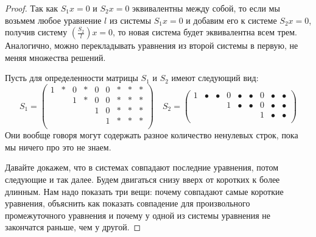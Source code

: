 \begin{proof}
Так как $S_1 x = 0$ и $S_2x = 0$ эквивалентны между собой, то если мы возьмем любое уравнение $l$ из системы $S_1 x = 0$ и добавим его к системе $S_2 x = 0$, получив систему $\left(\frac{S_2}{l}\right)x=0$, то новая система будет эквивалентна всем трем. Аналогично, можно перекладывать уравнения из второй системы в первую, не меняя множества решений.

Пусть для определенности матрицы $S_1$  и $S_2$ имеют следующий вид:
\[
S_1 = 
\begin{pmatrix}
{1}&{*}&{0}&{*}&{0}&{0}&{*}&{*}&{*}\\
{}&{}&{1}&{*}&{0}&{0}&{*}&{*}&{*}\\
{}&{}&{}&{}&{1}&{0}&{*}&{*}&{*}\\
{}&{}&{}&{}&{}&{1}&{*}&{*}&{*}\\
\end{pmatrix}\quad
S_2 = 
\begin{pmatrix}
{1}&{\bullet}&{\bullet}&{0}&{\bullet}&{\bullet}&{0}&{\bullet}&{\bullet}\\
{}&{}&{}&{1}&{\bullet}&{\bullet}&{0}&{\bullet}&{\bullet}\\
{}&{}&{}&{}&{}&{}&{1}&{\bullet}&{\bullet}\\
\end{pmatrix}
\]
Они вообще говоря могут содержать разное количество ненулевых строк, пока мы ничего про это не знаем.

Давайте докажем, что в системах совпадают последние уравнения, потом следующие и так далее. Будем двигаться снизу вверх от коротких к более длинным. Нам надо показать три вещи: почему совпадают самые короткие уравнения, объяснить как показать совпадение для произвольного промежуточного уравнения и почему у одной из системы уравнения не закончатся раньше, чем у другой.


\end{proof}
